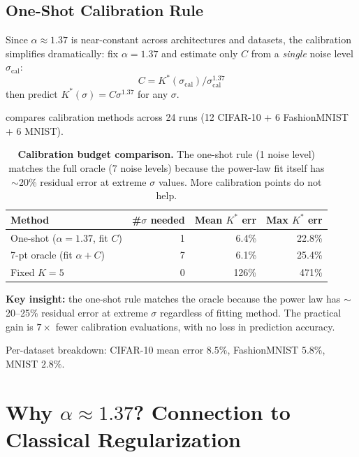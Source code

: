 \documentclass[letterpaper]{article}
\begin{document}
\subsection{One-Shot Calibration Rule}
\label{sec:oneshot}

Since $\alpha \approx 1.37$ is near-constant across architectures
and datasets, the calibration simplifies dramatically:
fix $\alpha = 1.37$ and estimate only $C$ from a \emph{single}
noise level $\sigma_{\text{cal}}$:
\begin{equation}
C = K^*(\sigma_{\text{cal}}) / \sigma_{\text{cal}}^{1.37}
\end{equation}
then predict $K^*(\sigma) = C\sigma^{1.37}$ for any $\sigma$.

 compares calibration methods across 24 runs
(12 CIFAR-10 + 6 FashionMNIST + 6 MNIST).

\begin{table}[t]
\centering\small
\begin{tabular}{lrrr}
\toprule
Method & \#$\sigma$ needed & Mean $K^*$ err & Max $K^*$ err \\
\midrule
One-shot ($\alpha{=}1.37$, fit $C$)  & 1 & 6.4\% & 22.8\% \\
7-pt oracle (fit $\alpha + C$)       & 7 & 6.1\% & 25.4\% \\
Fixed $K{=}5$                        & 0 & 126\% & 471\%  \\
\bottomrule
\end{tabular}
\caption{\textbf{Calibration budget comparison.}
The one-shot rule (1 noise level) matches the full oracle
(7 noise levels) because the power-law fit itself has
$\sim$20\% residual error at extreme $\sigma$ values.
More calibration points do not help.}
\label{tab:calibration}
\end{table}

\textbf{Key insight:} the one-shot rule matches the oracle because
the power law has $\sim$20--25\% residual error at extreme $\sigma$
regardless of fitting method.
The practical gain is $7\times$ fewer calibration evaluations,
with no loss in prediction accuracy.

Per-dataset breakdown: CIFAR-10 mean error $8.5\%$,
FashionMNIST $5.8\%$, MNIST $2.8\%$.

\section{Why $\alpha \approx 1.37$? Connection to Classical Regularization}
\label{sec:mechanism}
\end{document}
